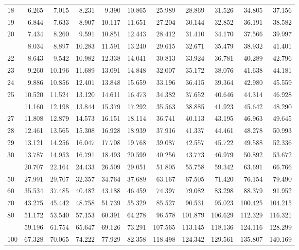 \documentclass[
]{article}
\begin{document}
\begin{table}[H]
\begin{tabular}{lrrrrrrrrrr}
18 & 6.265 & 7.015 & 8.231 & 9.390 & 10.865 & 25.989 & 28.869 & 31.526 & 34.805 & 37.156\\
19 & 6.844 & 7.633 & 8.907 & 10.117 & 11.651 & 27.204 & 30.144 & 32.852 & 36.191 & 38.582\\
20 & 7.434 & 8.260 & 9.591 & 10.851 & 12.443 & 28.412 & 31.410 & 34.170 & 37.566 & 39.997\\
\addlinespace
21 & 8.034 & 8.897 & 10.283 & 11.591 & 13.240 & 29.615 & 32.671 & 35.479 & 38.932 & 41.401\\
22 & 8.643 & 9.542 & 10.982 & 12.338 & 14.041 & 30.813 & 33.924 & 36.781 & 40.289 & 42.796\\
23 & 9.260 & 10.196 & 11.689 & 13.091 & 14.848 & 32.007 & 35.172 & 38.076 & 41.638 & 44.181\\
24 & 9.886 & 10.856 & 12.401 & 13.848 & 15.659 & 33.196 & 36.415 & 39.364 & 42.980 & 45.559\\
25 & 10.520 & 11.524 & 13.120 & 14.611 & 16.473 & 34.382 & 37.652 & 40.646 & 44.314 & 46.928\\
\addlinespace
26 & 11.160 & 12.198 & 13.844 & 15.379 & 17.292 & 35.563 & 38.885 & 41.923 & 45.642 & 48.290\\
27 & 11.808 & 12.879 & 14.573 & 16.151 & 18.114 & 36.741 & 40.113 & 43.195 & 46.963 & 49.645\\
28 & 12.461 & 13.565 & 15.308 & 16.928 & 18.939 & 37.916 & 41.337 & 44.461 & 48.278 & 50.993\\
29 & 13.121 & 14.256 & 16.047 & 17.708 & 19.768 & 39.087 & 42.557 & 45.722 & 49.588 & 52.336\\
30 & 13.787 & 14.953 & 16.791 & 18.493 & 20.599 & 40.256 & 43.773 & 46.979 & 50.892 & 53.672\\
\addlinespace
40 & 20.707 & 22.164 & 24.433 & 26.509 & 29.051 & 51.805 & 55.758 & 59.342 & 63.691 & 66.766\\
50 & 27.991 & 29.707 & 32.357 & 34.764 & 37.689 & 63.167 & 67.505 & 71.420 & 76.154 & 79.490\\
60 & 35.534 & 37.485 & 40.482 & 43.188 & 46.459 & 74.397 & 79.082 & 83.298 & 88.379 & 91.952\\
70 & 43.275 & 45.442 & 48.758 & 51.739 & 55.329 & 85.527 & 90.531 & 95.023 & 100.425 & 104.215\\
80 & 51.172 & 53.540 & 57.153 & 60.391 & 64.278 & 96.578 & 101.879 & 106.629 & 112.329 & 116.321\\
\addlinespace
90 & 59.196 & 61.754 & 65.647 & 69.126 & 73.291 & 107.565 & 113.145 & 118.136 & 124.116 & 128.299\\
100 & 67.328 & 70.065 & 74.222 & 77.929 & 82.358 & 118.498 & 124.342 & 129.561 & 135.807 & 140.169\\
\bottomrule
\end{tabular}
\end{table}
\end{document}
